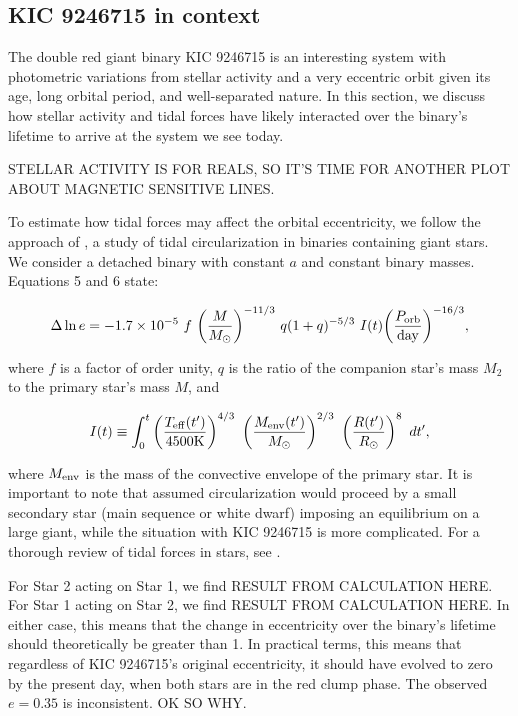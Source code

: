 \subsection{KIC 9246715 in context}\label{context}
The double red giant binary KIC 9246715 is an interesting system with photometric variations from stellar activity and a very eccentric orbit given its age, long orbital period, and well-separated nature. In this section, we discuss how stellar activity and tidal forces have likely interacted over the binary's lifetime to arrive at the system we see today.

STELLAR ACTIVITY IS FOR REALS, SO IT'S TIME FOR ANOTHER PLOT ABOUT MAGNETIC SENSITIVE LINES.

To estimate how tidal forces may affect the orbital eccentricity, we follow the approach of \citet{ver95}, a study of tidal circularization in binaries containing giant stars. We consider a detached binary with constant $a$ and constant binary masses. Equations 5 and 6 \citep{ver95} state:

\begin{equation}\label{tide1}
\Delta \ln e = -1.7 \times 10^{-5} \ f \ {\left( \frac{M}{M_{\odot}} \right)}^{-11/3} \ q(1+q)^{-5/3} \ I(t) {\left( \frac{P_{\rm{orb}}}{\rm{day}} \right)}^{-16/3},
\end{equation}

where $f$ is a factor of order unity, $q$ is the ratio of the companion star's mass $M_2$ to the primary star's mass $M$, and

\begin{equation}
I(t) \equiv \int_0^t \left( \frac{T_{\rm{eff}}(t')}{4500 \rm{K}} \right)^{4/3} \ \left( \frac{M_{\rm{env}}(t')}{M_{\odot}} \right)^{2/3} \ \left( \frac{R(t')}{R_{\odot}} \right)^8 \ dt',
\end{equation}

where $M_{\rm{env}}$ is the mass of the convective envelope of the primary star. It is important to note that \citet{ver95} assumed circularization would proceed by a small secondary star (main sequence or white dwarf) imposing an equilibrium on a large giant, while the situation with KIC 9246715 is more complicated. For a thorough review of tidal forces in stars, see \citet{ogi14}.

For Star 2 acting on Star 1, we find RESULT FROM CALCULATION HERE. For Star 1 acting on Star 2, we find RESULT FROM CALCULATION HERE. In either case, this means that the change in eccentricity over the binary's lifetime should theoretically be greater than 1. In practical terms, this means that regardless of KIC 9246715's original eccentricity, it should have evolved to zero by the present day, when both stars are in the red clump phase. The observed $e = 0.35$ is inconsistent. OK SO WHY.

